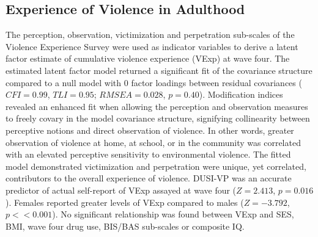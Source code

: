 \documentclass[utf8]{article}
\begin{document}
\subsection{Experience of Violence in Adulthood} The perception, observation, victimization and perpetration sub-scales of the Violence Experience Survey were used as indicator variables to derive a latent factor estimate of cumulative violence experience (VExp) at wave four. The estimated latent factor model returned a significant fit of the covariance structure compared to a null model with $0$ factor loadings between residual covariances ($CFI = 0.99$, $TLI = 0.95$; $RMSEA = 0.028$, $p = 0.40$). Modification indices revealed an enhanced fit when allowing the perception and observation measures to freely covary in the model covariance structure, signifying collinearity between perceptive notions and direct observation of violence. In other words, greater observation of violence at home, at school, or in the community was correlated with an elevated perceptive sensitivity to environmental violence. The fitted model demonstrated victimization and perpetration were unique, yet correlated, contributors to the overall experience of violence. DUSI-VP was an accurate predictor of actual self-report of VExp assayed at wave four ($Z=2.413$, $p=0.016$). Females reported greater levels of VExp compared to males ($Z=-3.792$, $p<<0.001$). No significant relationship was found between VExp and SES, BMI, wave four drug use, BIS/BAS sub-scales or composite IQ.  

\end{document}
